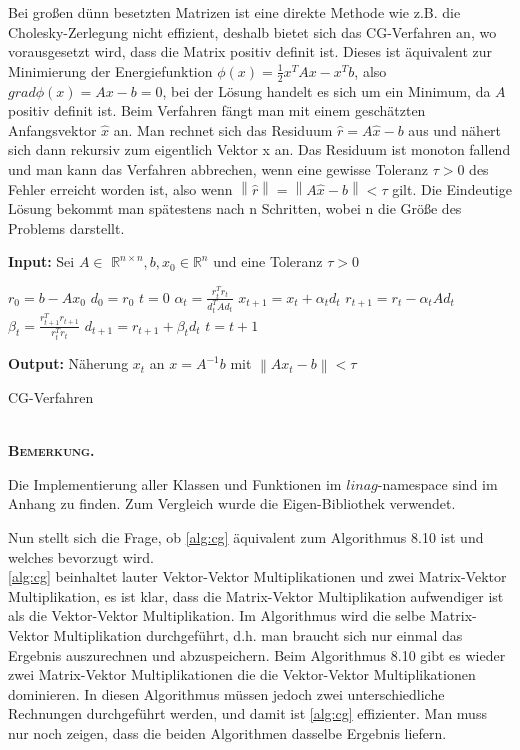 \documentclass[12pt,a4paper]{scrartcl}
\numberwithin{equation}{section}
\numberwithin{myalgctr}{section}
\numberwithin{mytheoremctr}{subsection}
\numberwithin{mykorollarctr}{subsection}
\numberwithin{mylemmactr}{subsection}
\numberwithin{mybeispielctr}{subsection}
\newenvironment{bemerkung}{%
	\bigskip\noindent%
	\textsc{\textbf{\\Bemerkung.}}%
	\indent
}{\par\bigskip}  %
\newcommand\norm[1]{\left\lVert#1\right\rVert}
\begin{document}
	Bei großen dünn besetzten Matrizen ist eine direkte Methode wie z.B. die Cholesky-Zerlegung nicht effizient, deshalb bietet sich das CG-Verfahren an, wo vorausgesetzt wird, dass die Matrix positiv definit ist. Dieses ist äquivalent zur Minimierung der Energiefunktion $\phi(x) = \frac{1}{2}x^{T}Ax - x^{T}b$, also $grad\phi(x) = Ax - b = 0$, bei der Lösung handelt es sich um ein Minimum, da $A$ positiv definit ist. Beim Verfahren fängt man mit einem geschätzten Anfangsvektor $\hat{x}$ an. Man rechnet sich das Residuum $\hat{r} = A\hat{x} - b$ aus und nähert sich dann rekursiv zum eigentlich Vektor x an. Das Residuum ist monoton fallend und man kann das Verfahren abbrechen, wenn eine gewisse Toleranz $\tau > 0$ des Fehler erreicht worden ist, also wenn $\norm{\hat{r}} = \norm{A\hat{x} - b} < \tau$ gilt. Die Eindeutige Lösung bekommt man spätestens nach n Schritten, wobei n die Größe des Problems darstellt.
	\begin{algorithm}[H]
		\textbf{Input:} Sei $A\in$ $\mathbb{R}^{n\times n}, b, x_0 \in \mathbb{R}^{n}$ und eine Toleranz $\tau > 0$
		\begin{algorithmic}[1]
			\State $r_0 = b - Ax_0$
			\State $d_0 = r_0$
			\State $t = 0$
			\While{$ \norm{r_t} > \tau $}
			\State $\alpha_t = \frac{r_t^{T}r_t}{d_t^{T}Ad_t}$
			\State $x_{t+1} = x_{t} + \alpha_t d_t$
			\State $r_{t+1} = r_t - \alpha_t Ad_t$
			\State $\beta_t = \frac{r_{t+1}^{T}r_{t+1}}{r_t^{T}r_t}$
			\State $d_{t+1} = r_{t+1} + \beta_td_t$
			\State $t = t + 1$
			\EndWhile
		\end{algorithmic}
		\textbf{Output:} Näherung $x_t$ an $x = A^{-1}b$ mit $\norm{Ax_t-b} < \tau$
		
		\caption{CG-Verfahren} \label{alg:cg}
	\end{algorithm}
	
	 
	
	\begin{bemerkung}
		Die Implementierung aller Klassen und Funktionen im $linag$-namespace sind im Anhang zu finden. Zum Vergleich wurde die Eigen-Bibliothek verwendet. 
	\end{bemerkung}
		
	Nun stellt sich die Frage, ob \cref{alg:cg} äquivalent zum Algorithmus 8.10 \autocite[101]{skript} ist und welches bevorzugt wird.\\
	\cref{alg:cg} beinhaltet lauter Vektor-Vektor Multiplikationen und zwei Matrix-Vektor Multiplikation, es ist klar, dass die Matrix-Vektor Multiplikation aufwendiger ist als die Vektor-Vektor Multiplikation. Im Algorithmus wird die selbe Matrix-Vektor Multiplikation durchgeführt, d.h. man braucht sich nur einmal das Ergebnis auszurechnen und abzuspeichern. Beim Algorithmus 8.10 gibt es wieder zwei Matrix-Vektor Multiplikationen die die Vektor-Vektor Multiplikationen dominieren. In diesen Algorithmus müssen jedoch zwei unterschiedliche Rechnungen durchgeführt werden, und damit ist \cref{alg:cg} effizienter. Man muss nur noch zeigen, dass die beiden Algorithmen dasselbe Ergebnis liefern.\\
	
\end{document}
